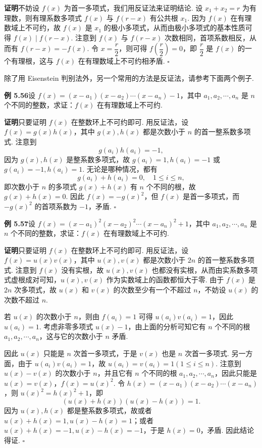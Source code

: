 \documentclass[UTF8,12pt,a4paper,fontset=fandol]{ctexart}
\begin{document}
\noindent\textbf{证明}\quad 不妨设 $f(x)$ 为首一多项式，我们用反证法来证明结论. 设 $x_1+x_2=r$ 为有理数，则有理系数多项式 $f(x)$ 与 $f(r-x)$ 有公共根 $x_1$. 因为 $f(x)$ 在有理数域上不可约，故 $f(x)$ 是 $x_1$ 的极小多项式，从而由极小多项式的基本性质可得 $f(x)\mid f(r-x)$. 注意到 $f(x)$ 与 $f(r-x)$ 次数相同，首项系数相反，从而有 $f(r-x)=-f(x)$. 令 $x=\dfrac r2$，则可得 $f\left(\dfrac r2\right)=0$，即 $\dfrac r2$ 是 $f(x)$ 的一个有理根，这与 $f(x)$ 在有理数域上不可约相矛盾. \hfill $\square$

除了用 Eisenstein 判别法外，另一个常用的方法是反证法，请参考下面两个例子.

\noindent\textbf{例 5.56}\quad 设 $f(x)=(x-a_1)(x-a_2)\cdots(x-a_n)-1$，其中 $a_1,a_2,\cdots,a_n$ 是 $n$ 个不同的整数，求证：$f(x)$ 在有理数域上不可约.

\noindent\textbf{证明}\quad 只要证明 $f(x)$ 在整数环上不可约即可. 用反证法，设 $f(x)=g(x)h(x)$，其中 $g(x),h(x)$ 都是次数小于 $n$ 的首一整系数多项式. 注意到
\[
g(a_i)h(a_i)=-1,
\]
因为 $g(x),h(x)$ 是整系数多项式，故 $g(a_i)=1,h(a_i)=-1$ 或 $g(a_i)=-1,h(a_i)=1$. 无论是哪种情况，都有
\[
g(a_i)+h(a_i)=0,\quad 1\le i\le n,
\]
即次数小于 $n$ 的多项式 $g(x)+h(x)$ 有 $n$ 个不同的根，故 $g(x)+h(x)=0$. 因此 $f(x)=-g(x)^2$，但 $f(x)$ 是首一多项式，而 $-g(x)^2$ 的首项系数为 $-1$，矛盾. \hfill $\square$

\noindent\textbf{例 5.57}\quad 设 $f(x)=(x-a_1)^2(x-a_2)^2\cdots(x-a_n)^2+1$，其中 $a_1,a_2,\cdots,a_n$ 是 $n$ 个不同的整数，求证：$f(x)$ 在有理数域上不可约.

\noindent\textbf{证明}\quad 只要证明 $f(x)$ 在整数环上不可约即可. 用反证法，设 $f(x)=u(x)v(x)$，其中 $u(x),v(x)$ 都是次数小于 $2n$ 的首一整系数多项式. 注意到 $f(x)$ 没有实根，故 $u(x),v(x)$ 也都没有实根，从而由实系数多项式虚根成对可知，$u(x),v(x)$ 作为实数域上的函数都恒大于零. 由于 $f(x)$ 是 $2n$ 次多项式，故 $u(x)$ 和 $v(x)$ 的次数至少有一个不超过 $n$，不妨设 $u(x)$ 的次数不超过 $n$.

若 $u(x)$ 的次数小于 $n$，则由 $f(a_i)=1$ 可得 $u(a_i)v(a_i)=1$，因此 $u(a_i)=1$. 考虑非零多项式 $u(x)-1$，由上面的分析可知它有 $n$ 个不同的根 $a_1,a_2,\cdots,a_n$，这与它的次数小于 $n$ 矛盾.

因此 $u(x)$ 只能是 $n$ 次首一多项式，于是 $v(x)$ 也是 $n$ 次首一多项式. 另一方面，由于 $u(a_i)v(a_i)=1$，故 $u(a_i)=v(a_i)=1(1\le i\le n)$. 注意到 $u(x)-v(x)$ 的次数小于 $n$，并且它有 $n$ 个不同的根 $a_1,a_2,\cdots,a_n$，因此只能是 $u(x)=v(x)$，$f(x)=u(x)^2$. 令 $h(x)=(x-a_1)(x-a_2)\cdots(x-a_n)$，则 $u(x)^2=h(x)^2+1$，即
\[
(u(x)+h(x))(u(x)-h(x))=1.
\]
因为 $u(x),h(x)$ 都是整系数多项式，故或者 $u(x)+h(x)=1,u(x)-h(x)=1$；或者 $u(x)+h(x)=-1,u(x)-h(x)=-1$，于是 $h(x)=0$，矛盾. 因此结论得证. \hfill $\square$
\end{document}
